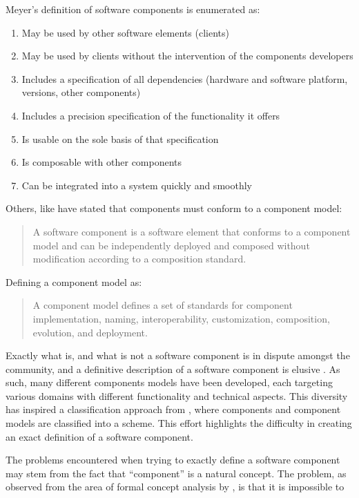 Meyer's definition of software components is enumerated as:
\begin{enumerate}
  \item May be used by other software elements (clients)
  \item May be used by clients without the intervention of the components developers
  \item Includes a specification of all dependencies (hardware and software platform, versions, other components)
  \item Includes a precision specification of the functionality it offers
  \item Is usable on the sole basis of that specification
  \item Is composable with other components
  \item Can be integrated into a system quickly and smoothly
\end{enumerate}

Others, like \citep{heineman2001component} have stated that components must conform to a component model: 
\begin{quotation}
A software component is a software element that conforms to a component model and can be independently deployed and composed without modification according to a composition standard.
\end{quotation}

Defining a component model as:
\begin{quotation}
A component model defines a set of standards for component implementation, naming, interoperability, customization, composition, evolution, and deployment.
\end{quotation}

Exactly what is, and what is not a software component is in dispute amongst the community,
and a definitive description of a software component is elusive \citep{vasa2007patterns}.
As such, many different components models have been developed, each targeting various domains with different functionality and technical aspects.
This diversity has inspired a classification approach from \citep{Crnkovic2011}, where components and component models are classified into a scheme.
This effort highlights the difficulty in creating an exact definition of a software component. 

The problems encountered when trying to exactly define a software component may stem from the fact that ``component'' is a natural concept.
The problem, as observed from the area of formal concept analysis \citep{Ganter1999} by \citep{Szyperski2002}, is that it is impossible to

